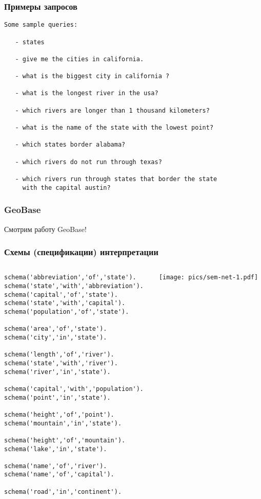 \documentclass[10pt]{beamer}
\begin{document}
\begin{frame}[fragile]
   \frametitle{Примеры запросов}
{\ttfamily\footnotesize
\begin{verbatim}
Some sample queries:

   - states

   - give me the cities in california.

   - what is the biggest city in california ?

   - what is the longest river in the usa?

   - which rivers are longer than 1 thousand kilometers?

   - what is the name of the state with the lowest point?

   - which states border alabama?

   - which rivers do not run through texas?

   - which rivers run through states that border the state
     with the capital austin?
\end{verbatim}}
\end{frame}

\begin{frame}
  \frametitle{GeoBase}
  \vfil
  \begin{center}
    \Large Смотрим работу GeoBase!
  \end{center}
  \vfil
\end{frame}

\begin{frame}[fragile]
  \frametitle{Схемы (спецификации) интерпретации}
  \begin{columns}
    \begin{column}{0.4\textwidth}
\begin{verbatim}
schema('abbreviation','of','state').
schema('state','with','abbreviation').
schema('capital','of','state').
schema('state','with','capital').
schema('population','of','state').

schema('area','of','state').
schema('city','in','state').

schema('length','of','river').
schema('state','with','river').
schema('river','in','state').

schema('capital','with','population').
schema('point','in','state').

schema('height','of','point').
schema('mountain','in','state').

schema('height','of','mountain').
schema('lake','in','state').

schema('name','of','river').
schema('name','of','capital').

schema('road','in','continent').
\end{verbatim}
    \end{column}
    \begin{column}{0.6\textwidth}
      \texttt{[image: pics/sem-net-1.pdf]}
    \end{column}
  \end{columns}
\end{frame}
\end{document}
